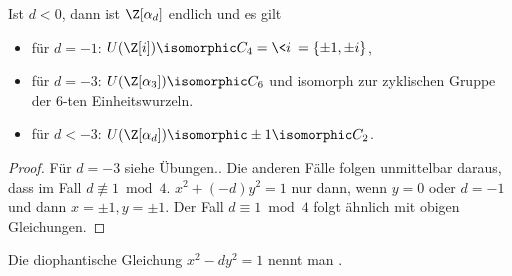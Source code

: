 \begin{st} \label{4.17}
	Ist $d < 0$, dann ist $\Z[\alpha_d]$ endlich und es gilt
	\begin{itemize}
		\item
			für $d = -1$: $U(\Z[i]) \isomorphic C_4 = \<i\> = \{ \pm 1, \pm i \}$,
		\item
			für $d = -3$: $U(\Z[\alpha_3]) \isomorphic C_6$ und isomorph zur zyklischen Gruppe der $6$-ten Einheitswurzeln.
		\item
			für $d < -3$: $U(\Z[\alpha_d]) \isomorphic \pm 1 \isomorphic C_2$.
	\end{itemize}
	\begin{proof}
		Für $d = -3$ siehe Übungen..
		Die anderen Fälle folgen unmittelbar daraus, dass im Fall $d \not\equiv 1 \bmod 4$. $x^2 + (-d) y^2 = 1$ nur dann, wenn $y = 0$ oder $d = -1$ und dann $x = \pm 1, y = \pm 1$.
		Der Fall $d \equiv 1 \bmod 4$ folgt ähnlich mit obigen Gleichungen.
	\end{proof}
\end{st}

\begin{df} \label{4.18}
	Die diophantische Gleichung $x^2 - dy^2 = 1$ nennt man .
\end{df}

